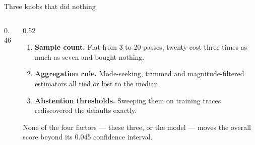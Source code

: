\documentclass[aspectratio=169,10pt]{beamer}
\begin{document}
\begin{frame}{Three knobs that did nothing}
  \begin{columns}[T]
    \begin{column}{0.46\textwidth}
    \end{column}
    \begin{column}{0.52\textwidth}
      \begin{enumerate}
        \item \textbf{Sample count.} Flat from 3 to 20 passes; twenty cost
          three times as much as seven and bought nothing.
        \item \textbf{Aggregation rule.} Mode-seeking, trimmed and
          magnitude-filtered estimators all tied or lost to the median.
        \item \textbf{Abstention thresholds.} Sweeping them on training traces
          rediscovered the defaults exactly.
      \end{enumerate}
      \vspace{2mm}
      None of the four factors --- these three, or the model --- moves the
      overall score beyond its 0.045 confidence interval.
    \end{column}
  \end{columns}
\end{frame}
\end{document}
